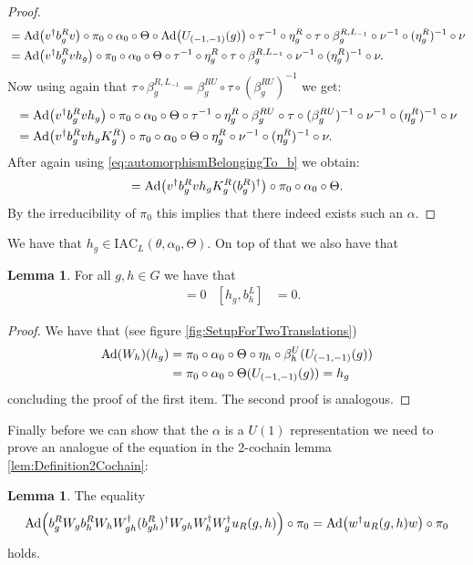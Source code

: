 \documentclass[12pt,a4paper,twoside]{article}
\newcommand{\IAC}{\textrm{IAC}}
\let\originalleft\left
\let\originalright\right
\renewcommand{\left}{\mathopen{}\mathclose\bgroup\originalleft}
\renewcommand{\right}{\aftergroup\egroup\originalright}
\newcommand{\Ad}[1]{\textrm{Ad}\left(#1\right)}
\theoremstyle{definition}
\newtheorem{lemma}[theorem]{Lemma}
\numberwithin{equation}{section}
\begin{document}
\begin{proof}
	\begin{align}
		&=\Ad{v^\dagger b_g^R v}\circ\pi_0\circ\alpha_0\circ\Theta\circ\Ad{U_{(-1,-1)}(g)}\circ\tau^{-1}\circ\eta_g^R\circ\tau\circ\beta_g^{R,L_{-1}}\circ\nu^{-1}\circ(\eta_g^R)^{-1}\circ\nu\\
		&=\Ad{v^\dagger b_g^R vh_g}\circ\pi_0\circ\alpha_0\circ\Theta\circ\tau^{-1}\circ\eta_g^R\circ\tau\circ\beta_g^{R,L_{-1}}\circ\nu^{-1}\circ(\eta_g^R)^{-1}\circ\nu.
	\end{align}
	Now using again that $\tau\circ\beta_g^{R,L_{-1}}=\beta_{g}^{RU}\circ\tau\circ(\beta_g^{RU})^{-1}$ we get:
	\begin{align}
		&=\Ad{v^\dagger b_g^R vh_g}\circ\pi_0\circ\alpha_0\circ\Theta\circ\tau^{-1}\circ\eta_g^R\circ\beta_{g}^{RU}\circ\tau\circ(\beta_g^{RU})^{-1}\circ\nu^{-1}\circ(\eta_g^R)^{-1}\circ\nu\\
		&=\Ad{v^\dagger b_g^R vh_gK_g^R}\circ\pi_0\circ\alpha_0\circ\Theta\circ\eta_g^R\circ\nu^{-1}\circ(\eta_g^R)^{-1}\circ\nu.
	\end{align}
	After again using \eqref{eq:automorphismBelongingTo_b} we obtain:
	\begin{align}
		=\Ad{v^\dagger b_g^R vh_gK_g^R(b_g^R)^\dagger}\circ\pi_0\circ\alpha_0\circ\Theta.
	\end{align}
	By the irreducibility of $\pi_0$ this implies that there indeed exists such an $\alpha$.
\end{proof}
We have that $h_g\in\IAC_L(\theta,\alpha_0,\Theta)$. On top of that we also have that
\begin{lemma}\label{lem:W_g_And_h_g_Commute}
	For all $g,h\in G$ we have that
	\begin{align}
		[h_g,W_h]&=0&[h_g,b_h^L]&=0.
	\end{align}
\end{lemma}
\begin{proof}
	We have that (see figure \ref{fig:SetupForTwoTranslations})
	\begin{align}
		\Ad{W_h}(h_g)&=\pi_0\circ\alpha_0\circ\Theta\circ\eta_h\circ\beta_h^U(U_{(-1,-1)}(g))\\
		&=\pi_0\circ\alpha_0\circ\Theta(U_{(-1,-1)}(g))=h_g
	\end{align}
	concluding the proof of the first item. The second proof is analogous.
\end{proof}
Finally before we can show that the $\alpha$ is a $U(1)$ representation we need to prove an analogue of the equation in the 2-cochain lemma \ref{lem:Definition2Cochain}:
\begin{lemma}\label{lem:translating_u_R_To_The_Right_identity}
The equality
\begin{equation}
\Ad{b_g^R W_g b_h^R W_h W_{gh}^\dagger (b_{gh}^R)^\dagger W_{gh}W_h^\dagger W_g^\dagger u_R(g,h)}\circ\pi_0=\Ad{w^\dagger u_R(g,h) w}\circ\pi_0
\end{equation}
holds.
\end{lemma}
\end{document}
